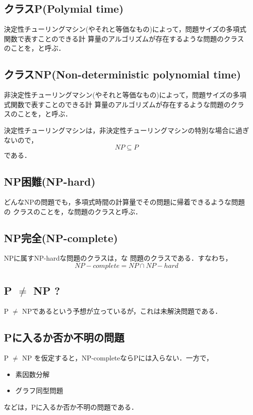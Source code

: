 \subsection{クラスP(Polymial time)}
決定性チューリングマシン(やそれと等価なもの)によって，問題サイズの多項式関数で表すことのできる計
算量のアルゴリズムが存在するような問題のクラスのことを，と呼ぶ．

\subsection{クラスNP(Non-deterministic polynomial time)}
非決定性チューリングマシン(やそれと等価なもの)によって，問題サイズの多項式関数で表すことのできる計
算量のアルゴリズムが存在するような問題のクラスのことを，と呼ぶ．

決定性チューリングマシンは，非決定性チューリングマシンの特別な場合に過ぎ
ないので，
\[
 NP \subseteq P
\]
である．

\subsection{NP困難(NP-hard)}
どんなNPの問題でも，多項式時間の計算量でその問題に帰着できるような問題の
クラスのことを，な問題のクラスと呼ぶ．

\subsection{NP完全(NP-complete)}
NPに属すNP-hardな問題のクラスは，な
問題のクラスである．すなわち，
\[
 NP-complete = NP \cap NP-hard
\]

\subsection{P $\neq$ NP ?}
P $\neq$ NPであるという予想が立っているが，これは未解決問題である．

\subsection{Pに入るか否か不明の問題}
P $\neq$ NP を仮定すると，NP-completeならPには入らない．一方で，
\begin{itemize}
 \item 素因数分解
 \item グラフ同型問題
\end{itemize}
などは，Pに入るか否か不明の問題である．

